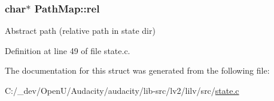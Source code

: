 \subsubsection[{\texorpdfstring{rel}{rel}}]{\setlength{\rightskip}{0pt plus 5cm}char$\ast$ Path\+Map\+::rel}\hypertarget{struct_path_map_aed8f9263efdca8b96ea67526ae9d8280}{}\label{struct_path_map_aed8f9263efdca8b96ea67526ae9d8280}


Abstract path (relative path in state dir) 



Definition at line 49 of file state.\+c.



The documentation for this struct was generated from the following file\+:\begin{DoxyCompactItemize}
\item 
C\+:/\+\_\+dev/\+Open\+U/\+Audacity/audacity/lib-\/src/lv2/lilv/src/\hyperlink{state_8c}{state.\+c}\end{DoxyCompactItemize}
